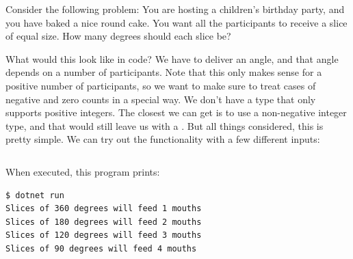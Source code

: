 Consider the following problem: You are hosting a children's birthday party, and you have baked a nice round cake. You want all the participants to receive a slice of equal size. How many degrees should each slice be?

What would this look like in code? We have to deliver an angle, and that angle depends on a number of participants. Note that this only makes sense for a positive number of participants, so we want to make sure to treat cases of negative and zero counts in a special way. We don't have a type that only supports positive integers. The closest we can get is to use a non-negative integer type, and that would still leave us with a . But all things considered, this is pretty simple. We can try out the functionality with a few different inputs:

\inputminted[]{csharp}{../src/csharp/functions/no_guard_no_function/Program.cs}

When executed, this program prints:
\begin{verbatim}
$ dotnet run
Slices of 360 degrees will feed 1 mouths
Slices of 180 degrees will feed 2 mouths
Slices of 120 degrees will feed 3 mouths
Slices of 90 degrees will feed 4 mouths
\end{verbatim}

